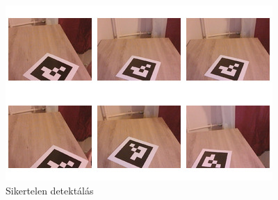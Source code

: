 \begin{figure}[htp]
    \centering
   	\includegraphics[width=\textwidth]{images/not_detect.jpg}
	\caption{Sikertelen detektálás}
	\label{fig:not_detect}
\end{figure}

